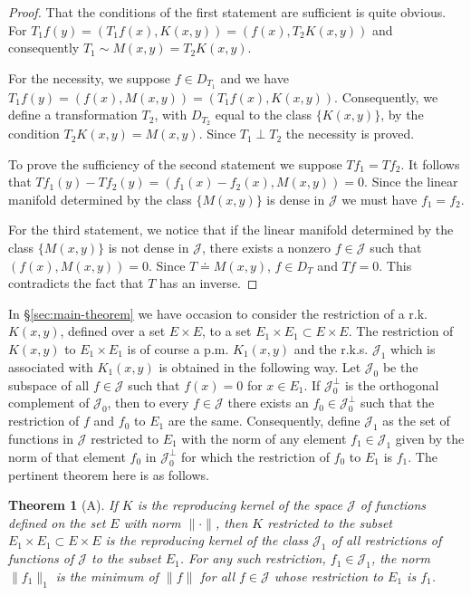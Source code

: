 \documentclass{article}
\newtheorem{theorem}{Theorem}
\begin{document}
\begin{proof}
That the conditions of the first statement are sufficient is quite obvious. For $T_1f(y) = (T_1f(x), K(x, y)) = (f(x), T_2K(x, y))$ and consequently $T_1 \sim M(x, y) = T_2K(x,y)$.

For the necessity, we suppose $f \in D_{T_1}$ and we have $T_1f(y) = (f(x), M(x, y)) = (T_1f(x), K(x, y))$. Consequently, we define a transformation $T_2$, with $D_{T_2}$ equal to the class $\{K(x, y)\}$, by the condition $T_2K(x, y) = M(x, y)$. Since $T_1 \perp T_2$ the necessity is proved.

To prove the sufficiency of the second statement we suppose $Tf_1 = Tf_2$. It follows that $Tf_1(y) - Tf_2(y) = (f_1(x) - f_2(x), M(x, y)) = 0$. Since the linear manifold determined by the class $\{M(x, y)\}$ is dense in $\mathcal{J}$ we must have $f_1 = f_2$.

For the third statement, we notice that if the linear manifold determined by the class $\{M(x, y)\}$ is not dense in $\mathcal{J}$, there exists a nonzero $f \in \mathcal{J}$ such that $(f(x), M(x, y)) = 0$. Since $T \doteq M(x, y)$, $f \in D_T$ and $Tf = 0$. This contradicts the fact that $T$ has an inverse.
\end{proof}

In §\ref{sec:main-theorem} we have occasion to consider the restriction of a r.k. $K(x, y)$, defined over a set $E \times E$, to a set $E_1 \times E_1 \subset E \times E$. The restriction of $K(x, y)$ to $E_1 \times E_1$ is of course a p.m. $K_1(x, y)$ and the r.k.s. $\mathcal{J}_1$ which is associated with $K_1(x, y)$ is obtained in the following way. Let $\mathcal{J}_0$ be the subspace of all $f \in \mathcal{J}$ such that $f(x) = 0$ for $x \in E_1$. If $\mathcal{J}_0^{\perp}$ is the orthogonal complement of $\mathcal{J}_0$, then to every $f \in \mathcal{J}$ there exists an $f_0 \in \mathcal{J}_0^{\perp}$ such that the restriction of $f$ and $f_0$ to $E_1$ are the same. Consequently, define $\mathcal{J}_1$ as the set of functions in $\mathcal{J}$ restricted to $E_1$ with the norm of any element $f_1 \in \mathcal{J}_1$ given by the norm of that element $f_0$ in $\mathcal{J}_0^{\perp}$ for which the restriction of $f_0$ to $E_1$ is $f_1$. The pertinent theorem here is as follows.

\begin{theorem}[A]
\label{thm:restriction}
If $K$ is the reproducing kernel of the space $\mathcal{J}$ of functions defined on the set $E$ with norm $\|\cdot\|$, then $K$ restricted to the subset $E_1 \times E_1 \subset E \times E$ is the reproducing kernel of the class $\mathcal{J}_1$ of all restrictions of functions of $\mathcal{J}$ to the subset $E_1$. For any such restriction, $f_1 \in \mathcal{J}_1$, the norm $\|f_1\|_1$ is the minimum of $\|f\|$ for all $f \in \mathcal{J}$ whose restriction to $E_1$ is $f_1$.
\end{theorem}
\end{document}
